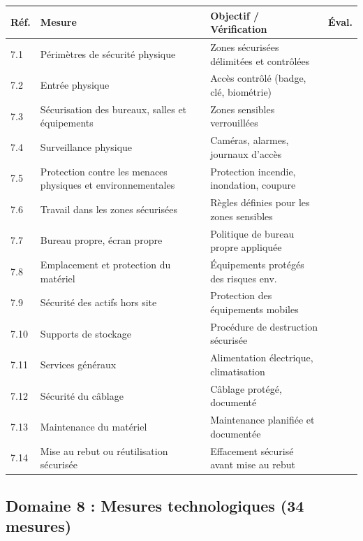 \documentclass[12pt,a4paper,oneside]{report}
\begin{document}
\begin{longtable}{|p{1.5cm}|p{6.5cm}|p{4.5cm}|p{1cm}|}
\hline
\rowcolor{theadcolor}
\color{white}\textbf{Réf.} &
\color{white}\textbf{Mesure} &
\color{white}\textbf{Objectif / Vérification} &
\color{white}\textbf{Éval.} \\
\hline\endhead\hline\endfoot
\rowcolor{trow1}
7.1 & Périmètres de sécurité physique &
  Zones sécurisées délimitées et contrôlées & \\
\hline\rowcolor{trow2}
7.2 & Entrée physique &
  Accès contrôlé (badge, clé, biométrie) & \\
\hline\rowcolor{trow1}
7.3 & Sécurisation des bureaux, salles et équipements &
  Zones sensibles verrouillées & \\
\hline\rowcolor{trow2}
7.4 & Surveillance physique &
  Caméras, alarmes, journaux d'accès & \\
\hline\rowcolor{trow1}
7.5 & Protection contre les menaces physiques et environnementales &
  Protection incendie, inondation, coupure & \\
\hline\rowcolor{trow2}
7.6 & Travail dans les zones sécurisées &
  Règles définies pour les zones sensibles & \\
\hline\rowcolor{trow1}
7.7 & Bureau propre, écran propre &
  Politique de bureau propre appliquée & \\
\hline\rowcolor{trow2}
7.8 & Emplacement et protection du matériel &
  Équipements protégés des risques env. & \\
\hline\rowcolor{trow1}
7.9 & Sécurité des actifs hors site &
  Protection des équipements mobiles & \\
\hline\rowcolor{trow2}
7.10 & Supports de stockage &
  Procédure de destruction sécurisée & \\
\hline\rowcolor{trow1}
7.11 & Services généraux &
  Alimentation électrique, climatisation & \\
\hline\rowcolor{trow2}
7.12 & Sécurité du câblage &
  Câblage protégé, documenté & \\
\hline\rowcolor{trow1}
7.13 & Maintenance du matériel &
  Maintenance planifiée et documentée & \\
\hline\rowcolor{trow2}
7.14 & Mise au rebut ou réutilisation sécurisée &
  Effacement sécurisé avant mise au rebut & \\
\hline
\end{longtable}

\subsection*{Domaine 8 : Mesures technologiques (34 mesures)}
\end{document}
